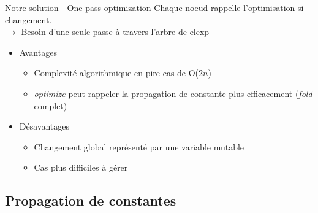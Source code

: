 \documentclass{beamer}
\begin{document}
\begin{frame}{Notre solution - One pass optimization}
  Chaque noeud rappelle l'optimisation si changement. \\
  $\rightarrow$ Besoin d'une seule passe à travers l'arbre de elexp
  \pause
  \begin{itemize}

    \item Avantages
      \begin{itemize}
        \item Complexité algorithmique en pire cas de O($2n$)
        \item \emph{optimize} peut rappeler la propagation de constante plus
          efficacement (\emph{fold} complet)
      \end{itemize}
  \pause
    \item Désavantages
      \begin{itemize}
        \item Changement global représenté par une variable mutable
        \item Cas plus difficiles à gérer
      \end{itemize}

  \end{itemize}
\end{frame}

\subsection{Propagation de constantes} 
\end{document}
